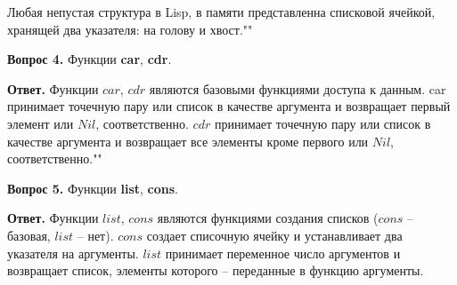Любая непустая структура в Lisp, в памяти представленна списковой ячейкой, хранящей два указателя: на голову и хвост.""\newline

\textbf{Вопрос 4.} Функции \textbf{car}, \textbf{cdr}.
	
\textbf{Ответ.} Функции $car$, $cdr$ являются базовыми функциями доступа к
данным. car принимает точечную пару или список в качестве аргумента
и возвращает первый элемент или $Nil$, соответственно. $cdr$ принимает точечную пару или список в качестве аргумента и возвращает все элементы
кроме первого или $Nil$, соответственно.""\newline
	
\textbf{Вопрос 5.} Функции \textbf{list}, \textbf{cons}.
	
\textbf{Ответ.} Функции $list$, $cons$ являются функциями создания списков
($cons$ – базовая, $list$ – нет). $cons$ создает списочную ячейку и устанавливает два указателя на аргументы. $list$ принимает переменное число аргументов и возвращает список, элементы которого – переданные в функцию
аргументы.